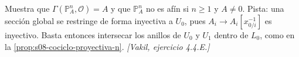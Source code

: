 \begin{ejer}[$\mathbb P_A^n$]
\label{ejer:s08-proyectiva-n}
Muestra que $\Gamma(\mathbb P_A^n,\mathcal O)=A$ y que $\mathbb P_A^n$ no es afín si $n\geq1$ y $A\ne0$. Pista: una sección global se restringe de forma inyectiva a $U_0$, pues $A_i\to A_i[x_{0/i}^{-1}]$ es inyectivo. Basta entonces intersecar los anillos de $U_0$ y $U_1$ dentro de $L_0$, como en la \cref{prop:s08-cociclo-proyectiva-n}. \emph{[Vakil, ejercicio 4.4.E.]}
\end{ejer}
